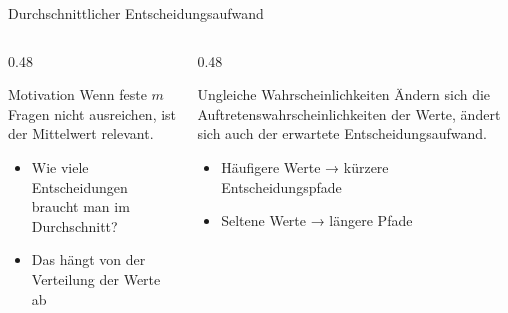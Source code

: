 \begin{frame}{Durchschnittlicher Entscheidungsaufwand}

\begin{columns}[T]
\begin{column}{0.48\textwidth}

\begin{block}{Motivation}
Wenn feste \(m\) Fragen nicht ausreichen, ist der Mittelwert relevant.
\end{block}

\begin{itemize}
  \item Wie viele Entscheidungen braucht man im Durchschnitt?
  \item Das hängt von der Verteilung der Werte ab
\end{itemize}

\end{column}

\begin{column}{0.48\textwidth}

\begin{blockC2}{Ungleiche Wahrscheinlichkeiten}
Ändern sich die Auftretenswahrscheinlichkeiten der Werte,
ändert sich auch der erwartete Entscheidungsaufwand.
\end{blockC2}

\begin{itemize}
  \item Häufigere Werte → kürzere Entscheidungspfade
  \item Seltene Werte → längere Pfade
\end{itemize}

\end{column}
\end{columns}
\end{frame}

